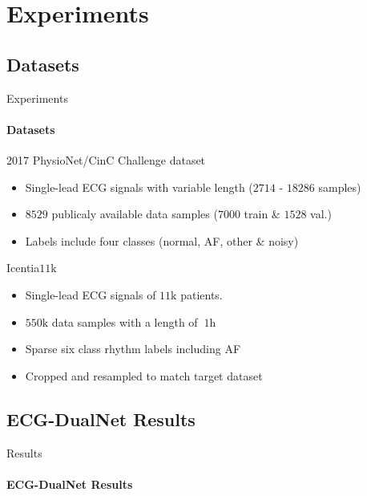 \section{Experiments}

\subsection{Datasets}
\begin{frame}{Experiments}
\framesubtitle{Datasets}
    \begin{block}{2017 PhysioNet/CinC Challenge dataset \cite{Clifford2017}}
        \begin{itemize}
            \item Single-lead ECG signals with variable length ($2714$ - $18286$ samples)
            \item $8529$ publicaly available data samples ($7000$ train \& $1528$ val.)
            \item Labels include four classes (normal, AF, other \& noisy)
        \end{itemize}
    \end{block}
    \pause
    \begin{block}{Icentia$11\si{\kilo}$ \cite{Tan2019}}
        \begin{itemize}
            \item Single-lead ECG signals of $11\si{\kilo}$ patients.
            \item $550\si{\kilo}$ data samples with a length of $~1\si{\hour}$
            \item Sparse six class rhythm labels including AF
            \item Cropped and resampled to match target dataset
        \end{itemize}
    \end{block}
\end{frame}

\subsection{ECG-DualNet Results}
\begin{frame}{Results}
\framesubtitle{ECG-DualNet Results}
    \begin{table}[h!]
        \centering
        \scriptsize{\caption{Classification results of our proposed approaches and baselines on the 2017 PhysioNet validation set.}}
        
        \label{tab:results}
    \end{table}
\end{frame}

